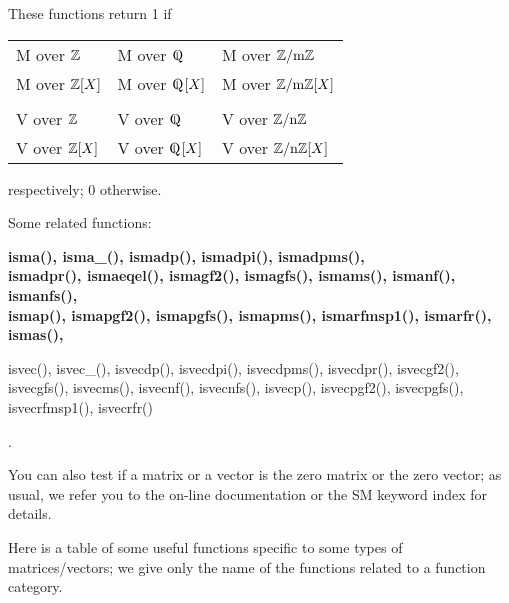 These functions return 1 if
\begin{center}
{\bf
\begin{tabular}{lll}
M over $\mbox{$\mathbb Z$}$ & M over $\Qfett$ & M over $\mbox{$\mathbb Z$}/\mbox{m}\mbox{$\mathbb Z$}$\\
M over $\mbox{$\mathbb Z$}[X]$ & M over $\Qfett[X]$ & M over $\mbox{$\mathbb Z$}/\mbox{m}\mbox{$\mathbb Z$}[X]$\\
&&\\
V over $\mbox{$\mathbb Z$}$ & V over $\Qfett$ & V over $\mbox{$\mathbb Z$}/\mbox{n}\mbox{$\mathbb Z$}$\\
V over $\mbox{$\mathbb Z$}[X]$ & V over $\Qfett[X]$ & V over $\mbox{$\mathbb Z$}/\mbox{n}\mbox{$\mathbb Z$}[X]$\\
\end{tabular} }
\end{center}
respectively; 0 otherwise.

Some related functions:\hspace*{0.7em}
{\bf  isma(), isma\_(), ismadp(), ismadpi(), ismadpms(), \\
ismadpr(), ismaeqel(), ismagf2(), ismagfs(), ismams(), ismanf(), ismanfs(), \\
ismap(), ismapgf2(), 
        ismapgfs(),
        ismapms(), ismarfmsp1(), ismarfr(), ismas(),

isvec(), isvec\_(), isvecdp(), isvecdpi(), isvecdpms(), isvecdpr(), isvecgf2(),\\
 isvecgfs(), isvecms(), isvecnf(), isvecnfs(), isvecp(), isvecpgf2(), isvecpgfs(), \\
isvecrfmsp1(), isvecrfr()}.

\leer\leer
You can also test if a matrix or a vector is the zero matrix or the zero vector;
as usual, we refer you to the on-line
documentation or the SM keyword index for details. 

\newpage

Here is a table of some 
useful functions specific to some types of matrices/vectors; we give only the 
name of the functions related to a function category.

